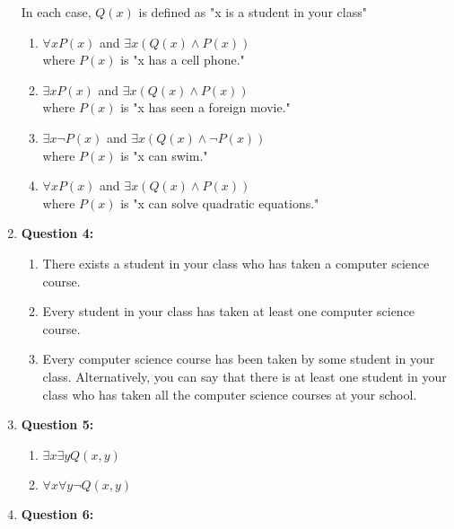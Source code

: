 \documentclass[11pt]{article}
\begin{document}
\begin{enumerate}
In each case, $Q(x)$ is defined as "x is a student in your class" 

\begin{enumerate}[label=(\alph*)]
\item 
$\forall x P(x)$ and $\exists x (Q(x) \land P(x))$
\\ where $P(x)$ is "x has a cell phone."

\item
$\exists x P(x)$ and $\exists x (Q(x) \land P(x))$
\\ where $P(x)$ is "x has seen a foreign movie."

\item
$\exists x \lnot P(x)$ and $\exists x (Q(x) \land \lnot P(x))$
\\ where $P(x)$ is "x can swim."

\item
$\forall x P(x)$ and $\exists x (Q(x) \land P(x))$
\\ where $P(x)$ is "x can solve quadratic equations."

\end{enumerate}

\item
\textbf{Question 4:}

\begin{enumerate}[label=(\alph*)]
\item
There exists a student in your class who has taken a computer science course. 

\item
Every student in your class has taken at least one computer science course.

\item
Every computer science course has been taken by some student in your class. Alternatively, you can say that there is at least one student in your class who has taken all the computer science courses at your school. 
\end{enumerate}

\item
\textbf{Question 5:}

\begin{enumerate}[label=(\alph*)]
\item
$\exists x \exists y Q(x, y)$

\item
$\forall x \forall y \lnot Q(x, y)$

\end{enumerate}

\item
\textbf{Question 6:}


\end{enumerate}
\end{document}
